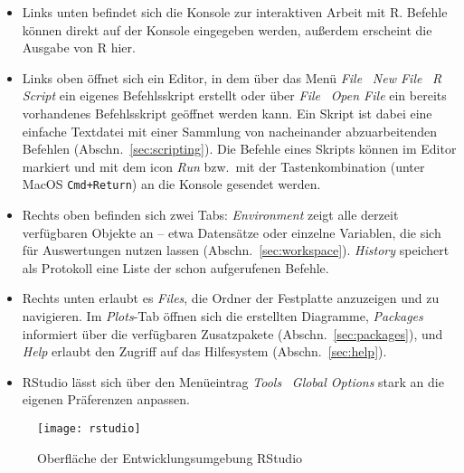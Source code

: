 \begin{itemize}
\item Links unten befindet sich die Konsole zur interaktiven Arbeit mit R. Befehle können direkt auf der Konsole eingegeben werden, außerdem erscheint die Ausgabe von R hier.
\item Links oben öffnet sich ein Editor, in dem über das Menü \emph{File} \textrightarrow\ \emph{New File} \textrightarrow\ \emph{R Script} ein eigenes Befehlsskript erstellt oder über \emph{File} \textrightarrow\ \emph{Open File} ein bereits vorhandenes Befehlsskript geöffnet werden kann. Ein Skript ist dabei eine einfache Textdatei mit einer Sammlung von nacheinander abzuarbeitenden Befehlen (Abschn.\ \ref{sec:scripting}). Die Befehle eines Skripts können im Editor markiert und mit dem icon \emph{Run} bzw.\ mit der Tastenkombination  (unter MacOS \texttt{Cmd+Return}) an die Konsole gesendet werden.
\item Rechts oben befinden sich zwei Tabs: \emph{Environment} zeigt alle derzeit verfügbaren Objekte an -- etwa Datensätze oder einzelne Variablen, die sich für Auswertungen nutzen lassen (Abschn.\ \ref{sec:workspace}). \emph{History} speichert als Protokoll eine Liste der schon aufgerufenen Befehle.
\item Rechts unten erlaubt es \emph{Files}, die Ordner der Festplatte anzuzeigen und zu navigieren. Im \emph{Plots}-Tab öffnen sich die erstellten Diagramme, \emph{Packages} informiert über die verfügbaren Zusatzpakete (Abschn.\ \ref{sec:packages}), und \emph{Help} erlaubt den Zugriff auf das Hilfesystem (Abschn.\ \ref{sec:help}).
\item RStudio lässt sich über den Menüeintrag \emph{Tools} \textrightarrow\ \emph{Global Options} stark an die eigenen Präferenzen anpassen.
\end{itemize}

\begin{figure}[ht]
\centering
\texttt{[image: rstudio]}
\vspace*{-0.5em}
\caption{Oberfläche der Entwicklungsumgebung RStudio}
\label{fig:rstudio}
\end{figure}

